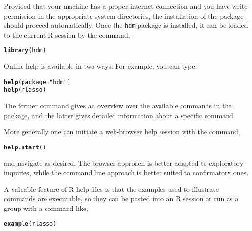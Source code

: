 \documentclass{amsart}\usepackage[]{graphicx}\usepackage[]{color}
\makeatletter
\newcommand{\hlstr}[1]{\textcolor[rgb]{0.192,0.494,0.8}{#1}}%
\newcommand{\hlstd}[1]{\textcolor[rgb]{0.345,0.345,0.345}{#1}}%
\newcommand{\hlkwc}[1]{\textcolor[rgb]{0.333,0.667,0.333}{#1}}%
\newcommand{\hlkwd}[1]{\textcolor[rgb]{0.737,0.353,0.396}{\textbf{#1}}}%
\newenvironment{kframe}{%
 \def\at@end@of@kframe{}%
 \ifinner\ifhmode%
  \def\at@end@of@kframe{\end{minipage}}%
  \begin{minipage}{\columnwidth}%
 \fi\fi%
 \def\FrameCommand##1{\hskip\@totalleftmargin \hskip-\fboxsep
 \colorbox{shadecolor}{##1}\hskip-\fboxsep
     \hskip-\linewidth \hskip-\@totalleftmargin \hskip\columnwidth}%
 \MakeFramed {\advance\hsize-\width
   \@totalleftmargin\z@ \linewidth\hsize
   \@setminipage}}%
 {\par\unskip\endMakeFramed%
 \at@end@of@kframe}
\newenvironment{knitrout}{}{} %
\newcommand{\R}{{\normalfont\textsf{R }}{}}
\makeatother
\begin{document}
\noindent
Provided that your machine has a proper internet connection and you
have write permission in the appropriate system directories,
the installation of the package should proceed automatically.
Once the \texttt{hdm} package is installed, it can be loaded to the current \R session by the command,
\begin{knitrout}
\color{fgcolor}\begin{kframe}
\begin{alltt}
\hlkwd{library}\hlstd{(hdm)}
\end{alltt}
\end{kframe}
\end{knitrout}


Online help is available in two ways.  For example, 
you  can type:
\begin{knitrout}
\color{fgcolor}\begin{kframe}
\begin{alltt}
\hlkwd{help}\hlstd{(}\hlkwc{package} \hlstd{=} \hlstr{"hdm"}\hlstd{)}
\hlkwd{help}\hlstd{(rlasso)}
\end{alltt}
\end{kframe}
\end{knitrout}
The former command gives an overview over the available commands in the package, and
the latter gives detailed information about a specific command.


More generally one can initiate a web-browser help session with the command,
\begin{knitrout}
\color{fgcolor}\begin{kframe}
\begin{alltt}
\hlkwd{help.start}\hlstd{()}
\end{alltt}
\end{kframe}
\end{knitrout}
and navigate as desired.  The browser approach is better adapted to exploratory inquiries, while the command line approach is better suited to confirmatory ones.

A valuable feature of \R help files is that the examples used to illustrate commands are executable, so they can be pasted into an \R session or run as a group with
a command like,

\begin{knitrout}
\color{fgcolor}\begin{kframe}
\begin{alltt}
\hlkwd{example}\hlstd{(rlasso)}
\end{alltt}
\end{kframe}
\end{knitrout}
\end{document}
